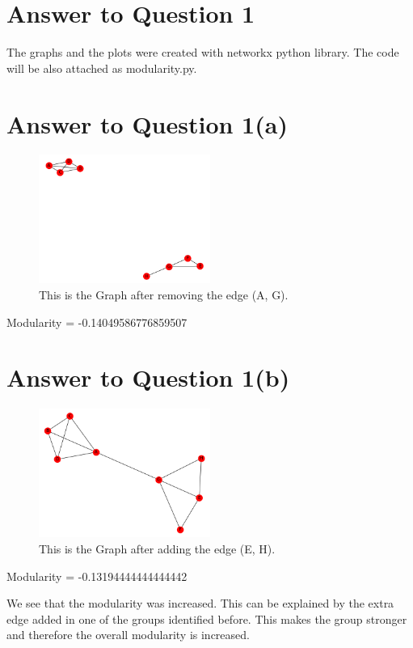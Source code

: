\documentclass[11pt]{article}
\begin{document}
\pagebreak[4]
\section*{Answer to Question 1}
The graphs and the plots were created with networkx python library. The code will be also attached as modularity.py.
\section*{Answer to Question 1(a)}
\begin{figure}[h]
\caption{This is the Graph after removing the edge (A, G).}
\centering
\includegraphics[width=0.5\textwidth]{./figures/G_a}
\end{figure}
Modularity =  -0.14049586776859507

\section*{Answer to Question 1(b)}
\begin{figure}[h]
\caption{This is the Graph after adding the edge (E, H).}
\centering
\includegraphics[width=0.5\textwidth]{./figures/G_b}
\end{figure}
Modularity =  -0.13194444444444442

We see that the modularity was increased. This can be explained by the extra edge added in one of the groups identified before. This makes the group stronger and therefore the overall modularity is increased.
\end{document}
